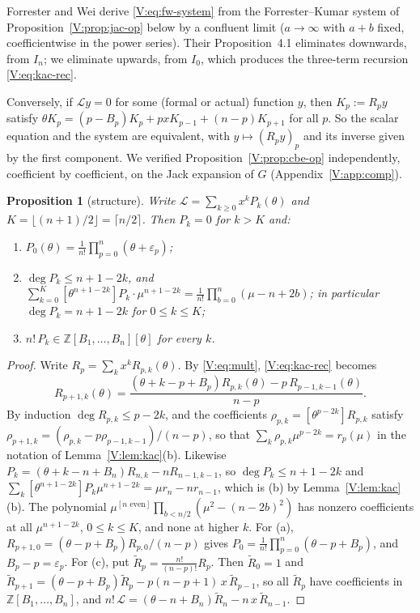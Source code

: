 \documentclass[11pt,a4paper]{article}
\newtheorem{proposition}[theorem]{Proposition}
\theoremstyle{definition}
\theoremstyle{remark}
\newcommand{\Z}{\mathbb Z}
\newcommand{\fl}[1]{\lfloor #1\rfloor}
\newcommand{\cl}[1]{\lceil #1\rceil}
\numberwithin{equation}{section}
\begin{document}
Forrester and Wei derive \eqref{V:eq:fw-system} from the Forrester--Kumar system of Proposition~\ref{V:prop:jac-op} below by a confluent limit ($a\to\infty$ with $a+b$ fixed, coefficientwise in the power series). Their Proposition~4.1 eliminates downwards, from $I_n$; we eliminate upwards, from $I_0$, which produces the three-term recursion \eqref{V:eq:kac-rec}.

Conversely, if $\mathcal Ly=0$ for some (formal or actual) function $y$, then $K_p:=R_py$ satisfy $\theta K_p=(p-B_p)K_p+pxK_{p-1}+(n-p)K_{p+1}$ for all $p$. So the scalar equation and the system are equivalent, with $y\mapsto(R_py)_p$ and its inverse given by the first component. We verified Proposition~\ref{V:prop:cbe-op} independently, coefficient by coefficient, on the Jack expansion of $G$ (Appendix~\ref{V:app:comp}).

\begin{proposition}[structure]\label{V:prop:cbe-structure}
Write $\mathcal L=\sum_{k\ge0}x^kP_k(\theta)$ and $K=\fl{(n+1)/2}=\cl{n/2}$. Then $P_k=0$ for $k>K$ and:
\begin{enumerate}
\item[(a)] $P_0(\theta)=\frac1{n!}\prod_{p=0}^{n}(\theta+\varepsilon_p)$;
\item[(b)] $\deg P_k\le n+1-2k$, and $\sum_{k=0}^{K}[\theta^{n+1-2k}]P_k\cdot\mu^{n+1-2k}=\frac1{n!}\prod_{b=0}^{n}(\mu-n+2b)$; in particular $\deg P_k=n+1-2k$ for $0\le k\le K$;
\item[(c)] $n!\,P_k\in\Z[B_1,\dots,B_n][\theta]$ for every $k$.
\end{enumerate}
\end{proposition}

\begin{proof}
Write $R_p=\sum_kx^kR_{p,k}(\theta)$. By \eqref{V:eq:mult}, \eqref{V:eq:kac-rec} becomes
\[
R_{p+1,k}(\theta)=\frac{(\theta+k-p+B_p)R_{p,k}(\theta)-p\,R_{p-1,k-1}(\theta)}{n-p}.
\]
By induction $\deg R_{p,k}\le p-2k$, and the coefficients $\rho_{p,k}=[\theta^{p-2k}]R_{p,k}$ satisfy $\rho_{p+1,k}=(\rho_{p,k}-p\rho_{p-1,k-1})/(n-p)$, so that $\sum_k\rho_{p,k}\mu^{p-2k}=r_p(\mu)$ in the notation of Lemma~\ref{V:lem:kac}(b). Likewise $P_k=(\theta+k-n+B_n)R_{n,k}-nR_{n-1,k-1}$, so $\deg P_k\le n+1-2k$ and $\sum_k[\theta^{n+1-2k}]P_k\mu^{n+1-2k}=\mu r_n-nr_{n-1}$, which is (b) by Lemma~\ref{V:lem:kac}(b). The polynomial $\mu^{[n\text{ even}]}\prod_{b<n/2}(\mu^2-(n-2b)^2)$ has nonzero coefficients at all $\mu^{n+1-2k}$, $0\le k\le K$, and none at higher $k$. For (a), $R_{p+1,0}=(\theta-p+B_p)R_{p,0}/(n-p)$ gives $P_0=\frac1{n!}\prod_{p=0}^{n}(\theta-p+B_p)$, and $B_p-p=\varepsilon_p$. For (c), put $\tilde R_p=\frac{n!}{(n-p)!}R_p$. Then $\tilde R_0=1$ and $\tilde R_{p+1}=(\theta-p+B_p)\tilde R_p-p(n-p+1)\,x\,\tilde R_{p-1}$, so all $\tilde R_p$ have coefficients in $\Z[B_1,\dots,B_n]$, and $n!\,\mathcal L=(\theta-n+B_n)\tilde R_n-n\,x\,\tilde R_{n-1}$.
\end{proof}
\end{document}
